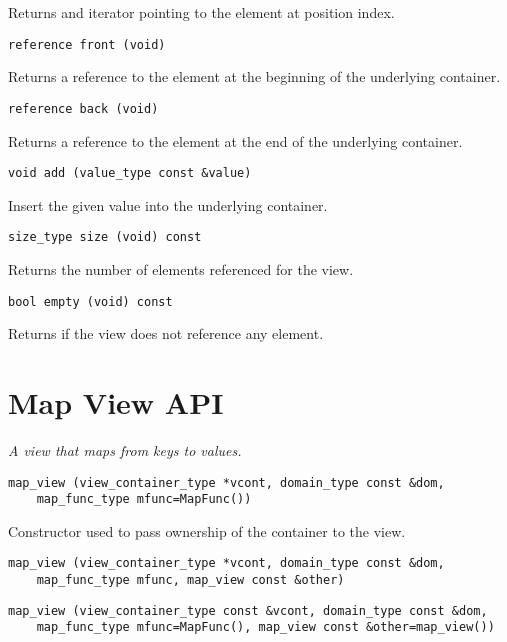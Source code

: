 Returns and iterator pointing to the element at position index.

\begin{verbatim}
reference front (void)
\end{verbatim}

Returns a reference to the element at the beginning of the underlying container.

\begin{verbatim}
reference back (void)
\end{verbatim}

Returns a reference to the element at the end of the underlying container.

\begin{verbatim}
void add (value_type const &value)
\end{verbatim}

Insert the given value into the underlying container.

\begin{verbatim}
size_type size (void) const
\end{verbatim}

Returns the number of elements referenced for the view.

\begin{verbatim}
bool empty (void) const
\end{verbatim}

Returns if the view does not reference any element.

\section{Map View API } \label{sec-map-vw}

\emph{ A view that maps from keys to values. }

\begin{verbatim}
map_view (view_container_type *vcont, domain_type const &dom,
    map_func_type mfunc=MapFunc())
\end{verbatim}

Constructor used to pass ownership of the container to the view.

\begin{verbatim}
map_view (view_container_type *vcont, domain_type const &dom,
    map_func_type mfunc, map_view const &other)
\end{verbatim}

\begin{verbatim}
map_view (view_container_type const &vcont, domain_type const &dom,
    map_func_type mfunc=MapFunc(), map_view const &other=map_view())
\end{verbatim}

